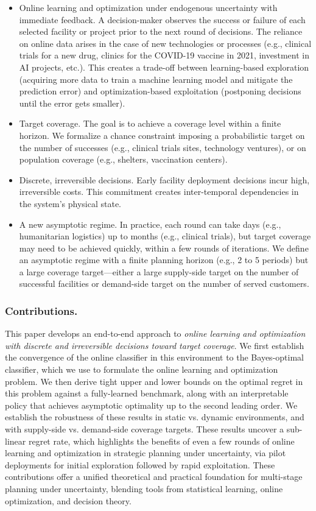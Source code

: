 \documentclass[blindrev]{informs3noheader}
\begin{document}
\begin{itemize}
    \item[--] Online learning and optimization under endogenous uncertainty with immediate feedback. A decision-maker observes the success or failure of each selected facility or project prior to the next round of decisions. The reliance on online data arises in the case of new technologies or processes (e.g., clinical trials for a new drug, clinics for the COVID-19 vaccine in 2021, investment in AI projects, etc.). This creates a trade-off between learning-based exploration (acquiring more data to train a machine learning model and mitigate the prediction error) and optimization-based exploitation (postponing decisions until the error gets smaller).
    \item[--] Target coverage. The goal is to achieve a coverage level within a finite horizon. We formalize a chance constraint imposing a probabilistic target on the number of successes (e.g., clinical trials sites, technology ventures), or on population coverage (e.g., shelters, vaccination centers).
    \item[--] Discrete, irreversible decisions. Early facility deployment decisions incur high, irreversible costs. This commitment creates inter-temporal dependencies in the system's physical state.
    \item[--] A new asymptotic regime. In practice, each round can take days (e.g., humanitarian logistics) up to months (e.g., clinical trials), but target coverage may need to be achieved quickly, within a few rounds of iterations. We define an asymptotic regime with a finite planning horizon (e.g., 2 to 5 periods) but a large coverage target---either a large supply-side target on the number of successful facilities or demand-side target on the number of served customers.
\end{itemize}

\subsubsection*{Contributions.}

This paper develops an end-to-end approach to \textit{online learning and optimization with discrete and irreversible decisions toward target coverage}. We first establish the convergence of the online classifier in this environment to the Bayes-optimal classifier, which we use to formulate the online learning and optimization problem. We then derive tight upper and lower bounds on the optimal regret in this problem against a fully-learned benchmark, along with an interpretable policy that achieves asymptotic optimality up to the second leading order. We establish the robustness of these results in static vs. dynamic environments, and with supply-side vs. demand-side coverage targets. These results uncover a sub-linear regret rate, which highlights the benefits of even a few rounds of online learning and optimization in strategic planning under uncertainty, via pilot deployments for initial exploration followed by rapid exploitation. These contributions offer a unified theoretical and practical foundation for multi-stage planning under uncertainty, blending tools from statistical learning, online optimization, and decision theory.
\end{document}
